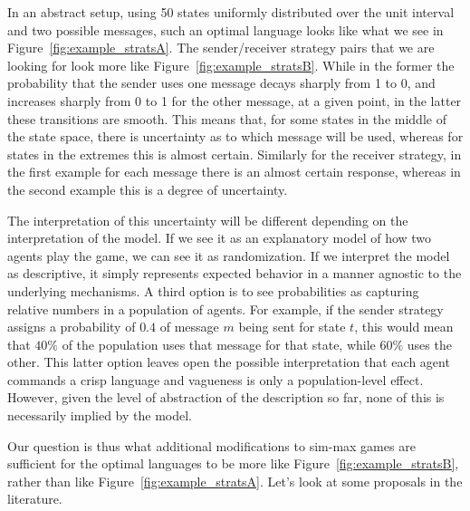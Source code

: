 \documentclass[a4paper]{article}
\begin{document}
In an abstract setup, using 50 states uniformly distributed over the unit interval and two possible messages, such an optimal language looks like what we see in Figure~\ref{fig:example_stratsA}.
The sender/receiver strategy pairs that we are looking for look more like Figure~\ref{fig:example_stratsB}.
While in the former the probability that the sender uses one message decays sharply from 1 to 0, and increases sharply from 0 to 1 for the other message, at a given point, in the latter these transitions are smooth.
This means that, for some states in the middle of the state space, there is uncertainty as to which message will be used, whereas for states in the extremes this is almost certain.
Similarly for the receiver strategy, in the first example for each message there is an almost certain response, whereas in the second example this is a degree of uncertainty.

The interpretation of this uncertainty will be different depending on the interpretation of the model.
If we see it as an explanatory model of how two agents play the game, we can see it as randomization.
If we interpret the model as descriptive, it simply represents expected behavior in a manner agnostic to the underlying mechanisms.
A third option is to see probabilities as capturing relative numbers in a population of agents.
For example, if the sender strategy assigns a probability of $0.4$ of message $m$ being sent for state $t$, this would mean that $40\%$ of the population uses that message for that state, while $60\%$ uses the other.
This latter option leaves open the possible interpretation that each agent commands a crisp language and vagueness is only a population-level effect.
However, given the level of abstraction of the description so far, none of this is necessarily implied by the model.

Our question is thus what additional modifications to sim-max games are sufficient for the optimal languages to be more like Figure~\ref{fig:example_stratsB}, rather than like Figure~\ref{fig:example_stratsA}.
Let's look at some proposals in the literature.
\end{document}
